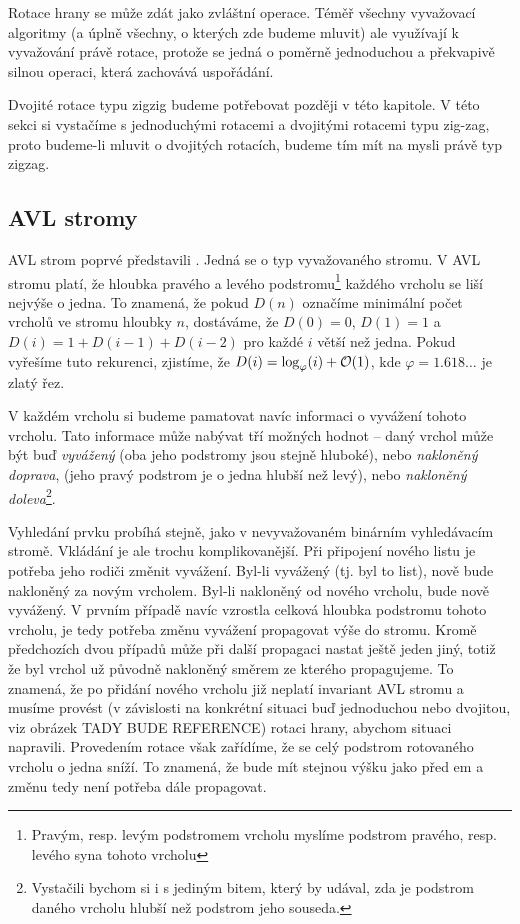 Rotace hrany se může zdát jako zvláštní operace. Téměř všechny vyvažovací algoritmy (a úplně všechny, o kterých zde budeme mluvit) ale využívají k vyvažování právě rotace, protože se jedná o poměrně jednoduchou a překvapivě silnou operaci, která zachovává uspořádání.

Dvojité rotace typu zigzig budeme potřebovat později v této kapitole. V této
sekci si vystačíme s jednoduchými rotacemi a dvojitými rotacemi typu zig-zag,
proto budeme-li mluvit o dvojitých rotacích, budeme tím mít na mysli právě typ
zigzag.

\subsection{AVL stromy}

AVL strom poprvé představili \citet{AVL}. Jedná se o typ vyvažovaného stromu. V
AVL stromu platí, že hloubka pravého a levého podstromu\footnote{Pravým, resp. levým podstromem vrcholu myslíme podstrom pravého, resp. levého syna tohoto vrcholu} každého vrcholu se liší
nejvýše o jedna. To znamená, že pokud $D(n)$ označíme minimální počet vrcholů
ve stromu hloubky $n$, dostáváme, že $D(0)=0$, $D(1)=1$ a
$D(i)=1+D(i-1)+D(i-2)$ pro každé $i$ větší než jedna. Pokud vyřešíme tuto
rekurenci, zjistíme, že $D(i)=\log_\varphi(i) + \mathcal O(1)$, kde $\varphi = 1.618\dots$ je zlatý
řez.

V každém vrcholu si budeme pamatovat navíc informaci o vyvážení tohoto vrcholu.
Tato informace může nabývat tří možných hodnot -- daný vrchol může být buď
\emph{vyvážený} (oba jeho podstromy jsou stejně hluboké), nebo \emph{nakloněný
doprava}, (jeho pravý podstrom je o jedna hlubší než levý), nebo
\emph{nakloněný doleva}\footnote{Vystačili bychom si i s jediným bitem, který by udával, zda je podstrom daného vrcholu hlubší než podstrom jeho souseda.}.

Vyhledání prvku probíhá stejně, jako v nevyvažovaném binárním vyhledávacím stromě. 
Vkládání je ale trochu komplikovanější. Při připojení nového listu je potřeba
jeho rodiči změnit vyvážení. Byl-li vyvážený (tj. byl to list), nově bude
nakloněný za novým vrcholem. Byl-li nakloněný od nového vrcholu, bude nově
vyvážený. V prvním případě navíc vzrostla celková hloubka podstromu tohoto
vrcholu, je tedy potřeba změnu vyvážení propagovat výše do stromu. Kromě
předchozích dvou případů  může při další propagaci nastat ještě jeden jiný,
totiž že byl vrchol už původně nakloněný směrem ze kterého propagujeme. To
znamená, že po přidání nového vrcholu již neplatí invariant AVL stromu a musíme
provést (v závislosti na konkrétní situaci buď jednoduchou nebo dvojitou, viz
obrázek TADY BUDE REFERENCE) rotaci hrany, abychom situaci napravili.
Provedením rotace však zařídíme, že se celý podstrom rotovaného vrcholu o jedna
sníží. To znamená, že bude mít stejnou výšku jako před em a změnu tedy
není potřeba dále propagovat.   

